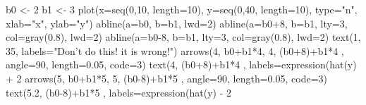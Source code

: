 \begin{Schunk}
\begin{Sinput}
 b0 <- 2
 b1 <- 3
 plot(x=seq(0,10, length=10), y=seq(0,40, length=10), type="n", xlab="x", ylab="y")
 abline(a=b0, b=b1, lwd=2)
 abline(a=b0+8, b=b1, lty=3, col=gray(0.8), lwd=2)
 abline(a=b0-8, b=b1, lty=3, col=gray(0.8), lwd=2)
 text(1, 35, labels="Don't do this! \n it is wrong!")
 arrows(4, b0+b1*4,	4, (b0+8)+b1*4 , angle=90, length=0.05, code=3)
 text(4, (b0+8)+b1*4 , labels=expression(hat(y) + 2 %*% rmse), pos=2)
 arrows(5, b0+b1*5,	5, (b0-8)+b1*5 , angle=90, length=0.05, code=3)
 text(5.2, (b0-8)+b1*5 , labels=expression(hat(y) - 2 %*% rmse), pos=4)
\end{Sinput}
\end{Schunk}
